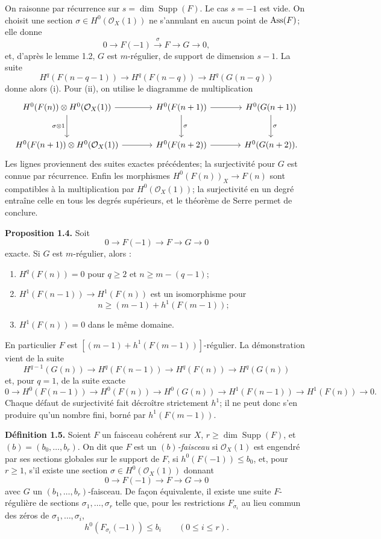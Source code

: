 \documentclass[11pt]{article}
\begin{document}
On raisonne par r\'ecurrence sur $s=\dim\operatorname{Supp}(F)$. Le cas $s=-1$ est vide. On choisit une section $\sigma\in H^0(\mathcal O_X(1))$ ne s'annulant en aucun point de $\operatorname{Ass}(F)$; elle donne
\[
0\longrightarrow F(-1)\xrightarrow{\sigma}F\longrightarrow G\longrightarrow 0,
\]
et, d'apr\`es le lemme 1.2, $G$ est $m$-r\'egulier, de support de dimension $s-1$. La suite
\[
H^q(F(n-q-1))\longrightarrow H^q(F(n-q))\longrightarrow H^q(G(n-q))
\]
donne alors (i). Pour (ii), on utilise le diagramme de multiplication
\[
\begin{tikzcd}[column sep=large,row sep=large]
H^0(F(n))\otimes H^0(\mathcal O_X(1)) \arrow[r] \arrow[d,"\sigma\otimes 1"'] & H^0(F(n+1)) \arrow[r] \arrow[d,"\sigma"] & H^0(G(n+1)) \arrow[d,"\sigma"] \\
H^0(F(n+1))\otimes H^0(\mathcal O_X(1)) \arrow[r] & H^0(F(n+2)) \arrow[r] & H^0(G(n+2)).
\end{tikzcd}
\]
Les lignes proviennent des suites exactes pr\'ec\'edentes; la surjectivit\'e pour $G$ est connue par r\'ecurrence. Enfin les morphismes $H^0(F(n))_X\to F(n)$ sont compatibles \`a la multiplication par $H^0(\mathcal O_X(1))$; la surjectivit\'e en un degr\'e entra\^ine celle en tous les degr\'es sup\'erieurs, et le th\'eor\`eme de Serre permet de conclure.

\textbf{Proposition 1.4.} Soit
\[
0\longrightarrow F(-1)\longrightarrow F\longrightarrow G\longrightarrow 0
\]
exacte. Si $G$ est $m$-r\'egulier, alors :
\begin{enumerate}[label=\roman*)]
\item $H^q(F(n))=0$ pour $q\ge2$ et $n\ge m-(q-1)$;
\item $H^1(F(n-1))\to H^1(F(n))$ est un isomorphisme pour
\[
 n\ge (m-1)+h^1(F(m-1));
\]
\item $H^1(F(n))=0$ dans le m\^eme domaine.
\end{enumerate}
En particulier $F$ est $[(m-1)+h^1(F(m-1))]$-r\'egulier. La d\'emonstration vient de la suite
\[
H^{q-1}(G(n))\to H^q(F(n-1))\to H^q(F(n))\to H^q(G(n))
\]
et, pour $q=1$, de la suite exacte
\[
0\to H^0(F(n-1))\to H^0(F(n))\to H^0(G(n))\to H^1(F(n-1))\to H^1(F(n))\to0.
\]
Chaque d\'efaut de surjectivit\'e fait d\'ecro\^itre strictement $h^1$; il ne peut donc s'en produire qu'un nombre fini, born\'e par $h^1(F(m-1))$.

\textbf{D\'efinition 1.5.} Soient $F$ un faisceau coh\'erent sur $X$, $r\ge\dim\operatorname{Supp}(F)$, et $(b)=(b_0,\ldots,b_r)$. On dit que $F$ est un \emph{$(b)$-faisceau} si $\mathcal O_X(1)$ est engendr\'e par ses sections globales sur le support de $F$, si $h^0(F(-1))\le b_0$, et, pour $r\ge1$, s'il existe une section $\sigma\in H^0(\mathcal O_X(1))$ donnant
\[
0\to F(-1)\to F\to G\to0
\]
avec $G$ un $(b_1,\ldots,b_r)$-faisceau. De fa\c con \'equivalente, il existe une suite $F$-r\'eguli\`ere de sections $\sigma_1,\ldots,\sigma_r$ telle que, pour les restrictions $F_{\sigma_i}$ au lieu commun des z\'eros de $\sigma_1,\ldots,\sigma_i$,
\[
 h^0(F_{\sigma_i}(-1))\le b_i\qquad(0\le i\le r).
\]
\end{document}
